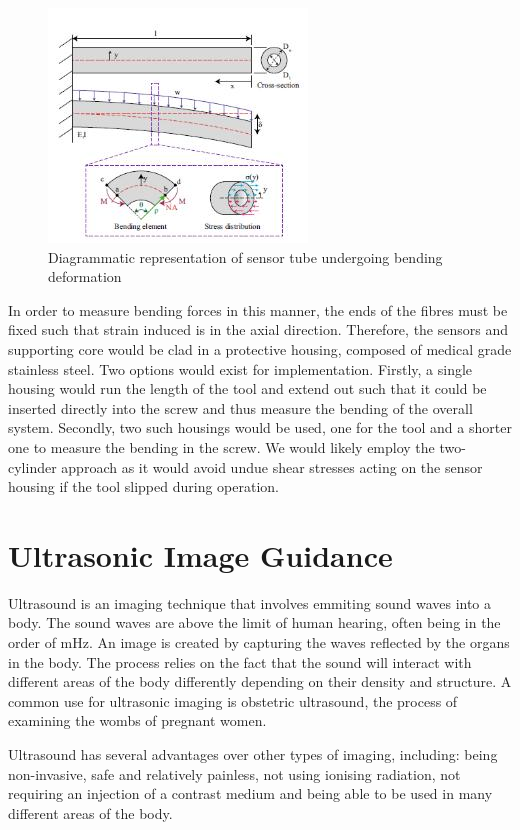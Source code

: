 \documentclass[conference, a4paper]{IEEEtran}
\begin{document}
\begin{figure}[h!]
	\centering
	\includegraphics{assets/bendingDeformation.jpg}
	\caption{Diagrammatic representation of sensor tube undergoing bending deformation\cite{Tsugawa2015}}
	\label{fig:deviation}
\end{figure}

In order to measure bending forces in this manner, the ends of the fibres must be fixed such that strain induced
is in the axial direction. Therefore, the sensors and supporting core would be clad in a protective housing,
composed of medical grade stainless steel. Two options would exist for implementation. Firstly, a single
housing would run the length of the tool and extend out such that it could be inserted directly into the screw and
thus measure the bending of the overall system. Secondly, two such housings would be used, one for the tool
and a shorter one to measure the bending in the screw. We would likely employ the two-cylinder approach as it
would avoid undue shear stresses acting on the sensor housing if the tool slipped during operation.


\section{Ultrasonic Image Guidance}
Ultrasound is an imaging technique that involves emmiting sound waves into a
body. The sound waves are above the limit of human hearing, often being in
the order of mHz. An image is created by capturing the waves reflected
by the organs in the body. 
The process relies on the fact that the sound will interact with
different areas of the body differently depending on their density and
structure\cite{ultraHist}. A common use for ultrasonic imaging is obstetric ultrasound,
the process of examining the wombs of pregnant women. 

Ultrasound has several advantages over other types of imaging, including:
being non-invasive, safe and relatively painless, not using ionising radiation,
not requiring an injection of a contrast medium and being able to be used in
many different areas of the body\cite{imagingExplained}. 
\end{document}
